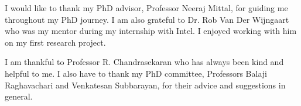 I would like to thank my PhD advisor, Professor Neeraj Mittal, for guiding me throughout my PhD journey. I am also grateful to Dr. Rob Van Der Wijngaart who was my mentor during my internship with Intel. I enjoyed working with him on my first research project.

I am thankful to Professor R. Chandrasekaran who has always been kind and helpful to me. I also have to thank my PhD committee, Professors Balaji Raghavachari and Venkatesan Subbarayan, for their advice and suggestions in general.